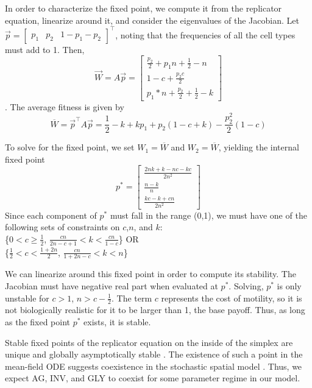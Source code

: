 \documentclass[12pt]{amsart}
\newcommand{\tab}{\hspace*{2em}}
\begin{document}
In order to characterize the fixed point, we compute it from the replicator equation, linearize around it, and consider the eigenvalues of the Jacobian.
Let $\vec{p} = { \begin{bmatrix} p_1 & p_2 & 1-p_1-p_2 \end{bmatrix}}^\top$, noting that the frequencies of all the cell types must add to 1. Then, $$\vec{W} = A\vec{p} = 
{\begin{bmatrix} \frac{p_2}{2} + p_1 n + \frac{1}{2}-n\\
1-c + \frac{p_2 c}{2}\\ %
p_1*n+\frac{p_2}{2} + \frac{1}{2}-k \end{bmatrix}}$$. The average fitness is given by  $$\overline{W} = \vec{p}^\top A \vec{p} = \frac{1}{2}-k+ k p_1 + p_2 (1 - c + k) - \frac{p_2^2}{2} (1-c) $$

To solve for the fixed point, we set $W_1 = \overline{W}$ and $W_2 = \overline{W}$, yielding the internal fixed point 
$$p^* = {\begin{bmatrix}\displaystyle{\frac{2 n k + k - n c - k c}{2n^2}}\\
		\displaystyle{\frac{n-k}{n}}\\
		\displaystyle{\frac{k c - k + c n}{2n^2}}
		\end{bmatrix}}$$
Since each component of $p^*$ must fall in the range (0,1), we must have one of the following sets of constraints on $c$,$n$, and $k$: \\
\{$\displaystyle{0 < c \ge \frac{1}{2}}$, $\displaystyle{\frac{c n}{2 n - c + 1} < k < \frac{c n}{1-c}}$\} \tab OR \\
\{$\displaystyle{\frac{1}{2} < c < \frac{1 + 2n}{2}}$, 
$\displaystyle{\frac{c n}{1 + 2n - c} < k < n}$\}

We can linearize around this fixed point in order to compute its stability. The Jacobian must have negative real part when evaluated at $p^*$. Solving, $p^*$ is only unstable for $c > 1$, $n > c - \frac{1}{2}$. The term $c$ represents the cost of motility, so it is not biologically realistic for it to be larger than 1, the base payoff. Thus, as long as the fixed point $p^*$ exists, it is stable.

Stable fixed points of the replicator equation on the inside of the simplex are unique and globally asymptotically stable \cite{Hofbauer1998}. The existence of such a point in the mean-field ODE suggests coexistence in the stochastic spatial model \cite{Durrett2009}. Thus, we expect AG, INV, and GLY to coexist for some parameter regime in our model.
\end{document}
